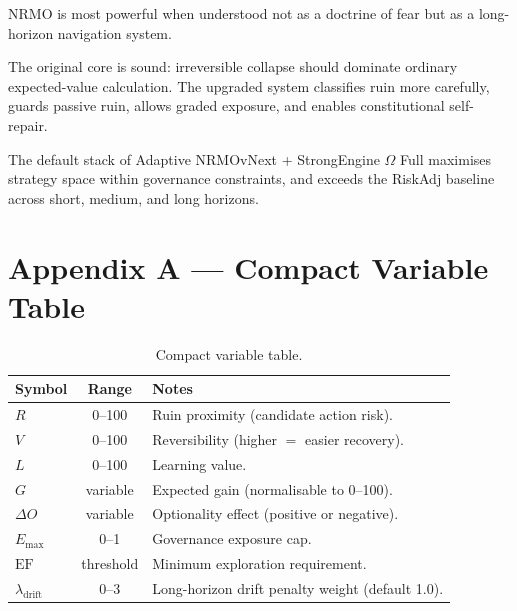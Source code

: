 NRMO is most powerful when understood not as a doctrine of fear but
as a long-horizon navigation system.

The original core is sound: irreversible collapse should dominate
ordinary expected-value calculation. The upgraded system classifies
ruin more carefully, guards passive ruin, allows graded exposure,
and enables constitutional self-repair.

The default stack of Adaptive NRMOvNext + StrongEngine $\Omega$
Full maximises strategy space within governance constraints, and
exceeds the RiskAdj baseline across short, medium, and long
horizons.


\clearpage
\section{Appendix A --- Compact Variable Table}
\label{sec:omega-variable-table}

\begin{table}[ht]
\centering
\small
\begin{tabularx}{\linewidth}{lcX}
\toprule
\textbf{Symbol} & \textbf{Range} & \textbf{Notes} \\
\midrule
$R$ & 0--100 & Ruin proximity (candidate action risk). \\
$V$ & 0--100 & Reversibility (higher $=$ easier recovery). \\
$L$ & 0--100 & Learning value. \\
$G$ & variable & Expected gain (normalisable to 0--100). \\
$\Delta O$ & variable & Optionality effect (positive or negative). \\
$E_{\max}$ & 0--1 & Governance exposure cap. \\
$\mathrm{EF}$ & threshold & Minimum exploration requirement. \\
$\lambda_{\mathrm{drift}}$ & 0--3 & Long-horizon drift penalty
weight (default 1.0). \\
\bottomrule
\end{tabularx}
\caption[Omega compact variable table]{Compact variable table.}
\label{tab:omega-variables}
\end{table}

